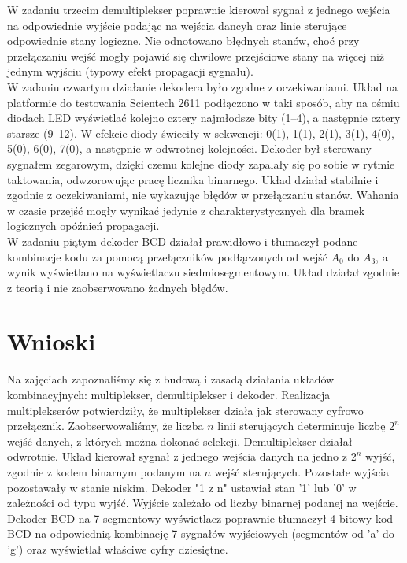 \documentclass{article}
\begin{document}
W zadaniu trzecim demultiplekser poprawnie kierował sygnał z jednego wejścia na odpowiednie wyjście podając na wejścia dancyh oraz linie sterujące odpowiednie stany logiczne. Nie odnotowano błędnych stanów, choć przy przełączaniu wejść mogły pojawić się chwilowe przejściowe stany na więcej niż jednym wyjściu (typowy efekt propagacji sygnału).\\

W zadaniu czwartym działanie dekodera było zgodne z oczekiwaniami. Układ na platformie do testowania Scientech 2611 podłączono w taki sposób, aby na ośmiu diodach LED wyświetlać kolejno cztery najmłodsze bity (1–4), a następnie cztery starsze (9–12). W efekcie diody świeciły w sekwencji:
0(1), 1(1), 2(1), 3(1), 4(0), 5(0), 6(0), 7(0),
a następnie w odwrotnej kolejności. Dekoder był sterowany sygnałem zegarowym, dzięki czemu kolejne diody zapalały się po sobie w rytmie taktowania, odwzorowując pracę licznika binarnego. Układ działał stabilnie i zgodnie z oczekiwaniami, nie wykazując błędów w przełączaniu stanów. Wahania w czasie przejść mogły wynikać jedynie z charakterystycznych dla bramek logicznych opóźnień propagacji.\\
W zadaniu piątym dekoder BCD działał prawidłowo i tłumaczył podane kombinacje kodu za pomocą przełączników  podłączonych od wejść $A_0$ do $A_3$, a wynik wyświetlano na wyświetlaczu siedmiosegmentowym. Układ działał zgodnie z teorią i nie zaobserwowano żadnych błędów. 

\pagebreak
\section{Wnioski}
Na zajęciach zapoznaliśmy się z budową i zasadą działania układów
kombinacyjnych: multiplekser, demultiplekser i dekoder. Realizacja
multiplekserów potwierdziły, że multiplekser działa jak sterowany
cyfrowo przełącznik. Zaobserwowaliśmy, że liczba $n$ linii sterujących
determinuje liczbę $2^n$ wejść danych, z których można dokonać selekcji. Demultiplekser
działał odwrotnie. Układ kierował sygnał z jednego wejścia danych na jedno z $2^n$
wyjść, zgodnie z kodem binarnym podanym na $n$ wejść sterujących. Pozostałe
wyjścia pozostawały w stanie niskim. Dekoder "1 z n" ustawiał
stan '1' lub '0' w zależności od typu wyjść. Wyjście zależało od liczby
binarnej podanej na wejście. Dekoder BCD na 7-segmentowy wyświetlacz poprawnie
tłumaczył 4-bitowy kod BCD na odpowiednią kombinację 7 sygnałów wyjściowych
(segmentów od 'a' do 'g') oraz wyświetlał właściwe cyfry dziesiętne.
\end{document}
